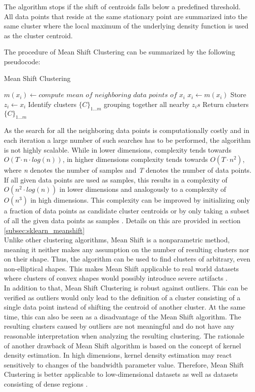 The algorithm stops if the shift of centroids falls below a predefined threshold. All data points that reside at the same stationary point are summarized into the same cluster where the local maximum of the underlying density function is used as the cluster centroid. 

The procedure of Mean Shift Clustering can be summarized by the following pseudocode:
\begin{algorithm}[H]
	\caption{Mean Shift Clustering} 
	\begin{algorithmic}[1]
				\State $m(x_{i})\leftarrow compute$ $mean$ $of$ $neighboring$ $data$ $points$ $of$ $x_{i}$
				\State $x_{i}\leftarrow m(x_{i})$
			\EndWhile
			\State Store $z_{i}\leftarrow x_{i}$ 
		\EndFor
		\State Identify clusters $\{C\}_{1\ldots m}$ grouping together all nearby $z_{i}s$ 
		\State Return clusters $\{C\}_{1 \ldots m}$
	\end{algorithmic} 
\end{algorithm}

As the search for all the neighboring data points is computationally costly and in each iteration a large number of such searches has to be performed, the algorithm is not highly scalable. While in lower dimensions, complexity tends towards $O(T \cdot n \cdot log(n))$, in higher dimensions complexity tends towards $O(T \cdot n^{2})$, where \textit{n} denotes the number of samples and \textit{T} denotes the number of data points. If all given data points are used as samples, this results in a complexity of $O(n^{2} \cdot log(n))$ in lower dimensions and analogously to a complexity of $O(n^{3})$ in high dimensions. This complexity can be improved by initializing only a fraction of data points as candidate cluster centroids or by only taking a subset of all the given data points as samples \cite{sklearn_api}. Details on this are provided in section \ref{subsec:sklearn_meanshift} \\
Unlike other clustering algorithms, Mean Shift is a nonparametric method, meaning it neither makes any assumption on the number of resulting clusters nor on their shape. Thus, the algorithm can be used to find clusters of arbitrary, even non-elliptical shapes. This makes Mean Shift applicable to real world datasets where clusters of convex shapes would possibly introduce severe artifacts \cite{comaniciu2002MeanShift}.\\
In addition to that, Mean Shift Clustering is robust against outliers. This can be verified as outliers would only lead to the definition of a cluster consisting of a single data point instead of shifting the centroid of another cluster. At the same time, this can also be seen as a disadvantage of the Mean Shift algorithm.
The resulting clusters caused by outliers are not meaningful and do not have any reasonable interpretation when analyzing the resulting clustering. 
The rationale of another drawback of Mean Shift algorithm is based on the concept of kernel density estimation. In high dimensions, kernel density estimation may react sensitively to changes of the bandwidth parameter value. Therefore, Mean Shift Clustering is better applicable to low-dimensional datasets as well as datasets consisting of dense regions \cite{CarreiraPerpin2015ARO}.
